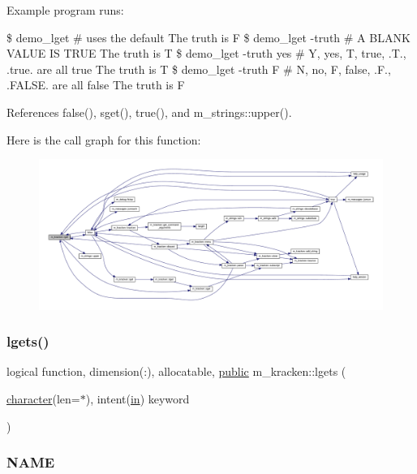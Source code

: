 Example program runs\+:

\$ demo\+\_\+lget \# uses the default The truth is F \$ demo\+\_\+lget -\/truth \# A B\+L\+A\+NK V\+A\+L\+UE IS T\+R\+UE The truth is T \$ demo\+\_\+lget -\/truth yes \# Y, yes, T, true, .T., .true. are all true The truth is T \$ demo\+\_\+lget -\/truth F \# N, no, F, false, .F., .F\+A\+L\+SE. are all false The truth is F 

References false(), sget(), true(), and m\+\_\+strings\+::upper().

Here is the call graph for this function\+:
\nopagebreak
\begin{figure}[H]
\begin{center}
\leavevmode
\includegraphics[width=350pt]{namespacem__kracken_a7141acd7a00c1a5aa5f90612a0414b63_cgraph}
\end{center}
\end{figure}
\mbox{\label{namespacem__kracken_afb3f3b45b78625758818ea9bef463fd9}} 
\subsubsection{\texorpdfstring{lgets()}{lgets()}}
{\footnotesize\ttfamily logical function, dimension(\+:), allocatable, \hyperlink{M__stopwatch_83_8txt_a2f74811300c361e53b430611a7d1769f}{public} m\+\_\+kracken\+::lgets (\begin{DoxyParamCaption}\item[{\hyperlink{option__stopwatch_83_8txt_abd4b21fbbd175834027b5224bfe97e66}{character}(len=$\ast$), intent(\hyperlink{M__journal_83_8txt_afce72651d1eed785a2132bee863b2f38}{in})}]{keyword }\end{DoxyParamCaption})}



\subsubsection*{N\+A\+ME}

